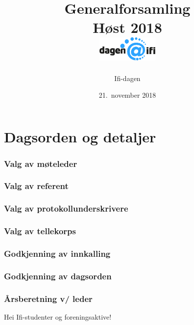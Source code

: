 \documentclass[10pt,norsk,a4paper]{article}
\title{Generalforsamling \\
	Høst 2018\\[3cm]
	\includegraphics[width=3cm,trim=0 4cm 0 0]{../../res/logo.png}\\}
\date{21.\ november 2018}
\author{Ifi-dagen}
\begin{document}
\maketitle{}
\newpage
\part{Dagsorden og detaljer}
\tableofcontents{}
\newpage


\section{Valg av møteleder}

\section{Valg av referent}

\section{Valg av protokollunderskrivere}

\section{Valg av tellekorps}

\section{Godkjenning av innkalling}

\section{Godkjenning av dagsorden}

\section{Årsberetning v/ leder}
Hei Ifi-studenter og foreningsaktive!
\end{document}

